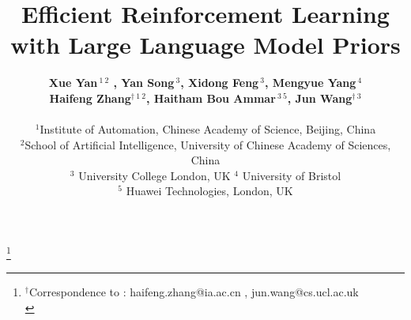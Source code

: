 \documentclass{article} %
\title{Efficient Reinforcement Learning \\with Large Language Model Priors}
\author{{\bf Xue Yan$^{~1~2}$ , Yan Song$^{~3}$, Xidong Feng$^{~3}$, 
Mengyue Yang$^{~4}$}\\{\bf Haifeng Zhang$^{\dag~1~2}$, Haitham Bou Ammar$^{~3~5}$, 
Jun Wang$^{\dag~3}$}
\\
\vspace{0.05 cm}\\
{$^1$Institute of Automation, Chinese Academy of Science, Beijing, China}\\
{$^2$School of Artificial Intelligence, University of Chinese Academy of Sciences, China}\\
{$^3$ University College London, UK}
{$^4$ University of Bristol}\\
{$^5$ Huawei Technologies, London, UK}}
\theoremstyle{plain}
\theoremstyle{definition}
\theoremstyle{remark}
\newcommand\blfootnote[1]{%
\begingroup
\renewcommand\thefootnote{}\footnote{#1}%
\addtocounter{footnote}{-1}%
\endgroup
}
\newcommand{\yanxue}[1]{{ \color{orange}[yanxue: #1]}}
\begin{document}
\maketitle
\blfootnote{$^\dag$Correspondence to : \textlangle haifeng.zhang@ia.ac.cn \textrangle, \textlangle jun.wang@cs.ucl.ac.uk\textrangle\\}







\end{document}
